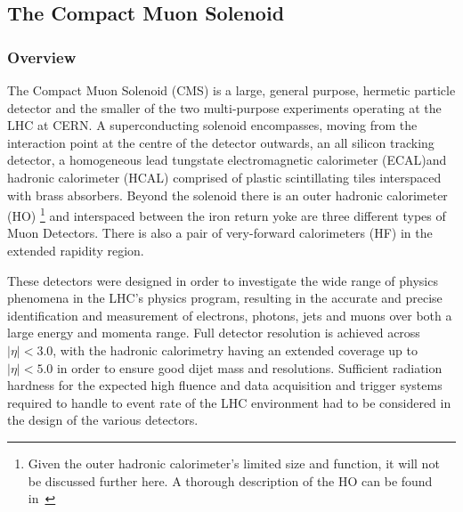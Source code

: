 \subsection{The Compact Muon Solenoid}\label{subsec:cms}

\subsubsection{Overview}
The Compact Muon Solenoid (CMS) is a large, general purpose, hermetic particle detector and the smaller of the two multi-purpose experiments operating at the LHC at CERN.
A superconducting solenoid encompasses, moving from the interaction point at the centre of the detector outwards, an all silicon tracking detector, a homogeneous lead tungstate electromagnetic calorimeter (ECAL)and hadronic calorimeter (HCAL) comprised of plastic scintillating tiles interspaced with brass absorbers.
Beyond the solenoid there is an outer hadronic calorimeter (HO) \footnote{Given the outer hadronic calorimeter's limited size and function, it will not be discussed further here. A thorough description of the HO can be found in~\cite{HO}} and interspaced between the iron return yoke are three different types of Muon Detectors.
There is also a pair of very-forward calorimeters (HF) in the extended rapidity region\cite{oldcms}.

These detectors were designed in order to investigate the wide range of physics phenomena in the LHC's physics program, resulting in the accurate and precise identification and measurement of electrons, photons, jets and muons over both a large energy and momenta range.
Full detector resolution is achieved across $|\eta| < 3.0$, with the hadronic calorimetry having an extended coverage up to $|\eta| < 5.0$ in order to ensure good dijet mass and \MET resolutions.
Sufficient radiation hardness for the expected high fluence and data acquisition and trigger systems required to handle to event rate of the LHC environment had to be considered in the design of the various detectors.


